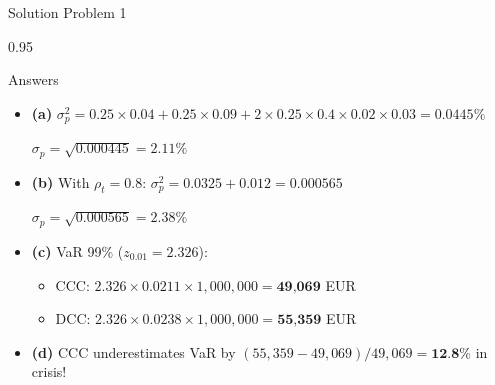 \documentclass[9pt, aspectratio=169, t]{beamer}
\begin{document}
\begin{frame}{Solution Problem 1}
    \begin{cminipage}{0.95\textwidth}
    {\footnotesize
    \begin{exampleblock}{Answers}
        \begin{itemize}\setlength{\itemsep}{0pt}
            \item \textbf{(a)} $\sigma_p^2 = 0.25 \times 0.04 + 0.25 \times 0.09 + 2 \times 0.25 \times 0.4 \times 0.02 \times 0.03 = 0.0445\%$

            $\sigma_p = \sqrt{0.000445} = 2.11\%$

            \vspace{0.15cm}

            \item \textbf{(b)} With $\rho_t = 0.8$: $\sigma_p^2 = 0.0325 + 0.012 = 0.000565$

            $\sigma_p = \sqrt{0.000565} = 2.38\%$

            \vspace{0.15cm}

            \item \textbf{(c)} VaR 99\% ($z_{0.01} = 2.326$):
            \begin{itemize}\setlength{\itemsep}{0pt}
                \item CCC: $2.326 \times 0.0211 \times 1{,}000{,}000 = \textbf{49{,}069}$ EUR
                \item DCC: $2.326 \times 0.0238 \times 1{,}000{,}000 = \textbf{55{,}359}$ EUR
            \end{itemize}

            \vspace{0.15cm}

            \item \textbf{(d)} CCC underestimates VaR by $(55{,}359 - 49{,}069)/49{,}069 = \textbf{12.8\%}$ in crisis!
        \end{itemize}
    \end{exampleblock}
    }
    \end{cminipage}
\end{frame}
\end{document}
